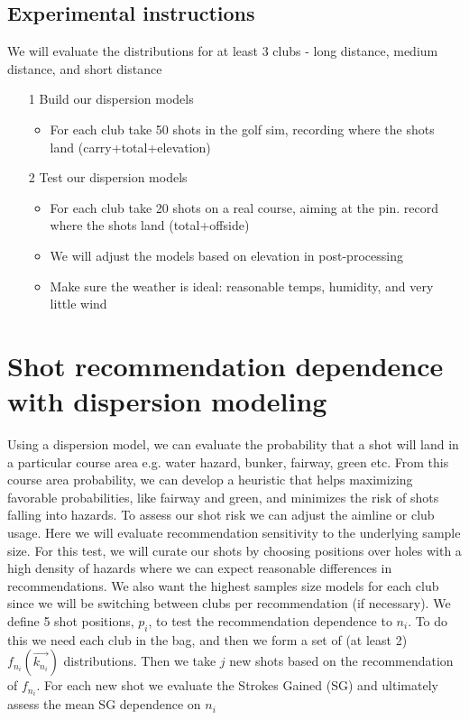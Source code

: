\documentclass{article}
\begin{document}
\subsection{Experimental instructions}
We will evaluate the distributions for at least 3 clubs - long distance, medium distance, and short distance\\
\begin{itemize}
	\item[1] Build our dispersion models
		\begin{itemize} 
			\item For each club take 50 shots in the golf sim, recording where the shots land (carry+total+elevation)
		\end{itemize}
	\item[2] Test our dispersion models
		\begin{itemize}
			\item For each club take 20 shots on a real course, aiming at the pin. record where the shots land (total+offside)
			\item We will adjust the models based on elevation in post-processing
			\item Make sure the weather is ideal: reasonable temps, humidity, and very little wind
		\end{itemize}
\end{itemize}


\section{Shot recommendation dependence with dispersion modeling}
Using a dispersion model, we can evaluate the probability that a shot will land in a particular course area e.g. water hazard, bunker, fairway, green etc. From this course area probability, we can develop a heuristic that helps maximizing favorable probabilities, like fairway and green, and minimizes the risk of shots falling into hazards. To assess our shot risk we can adjust the aimline or club usage. Here we will evaluate recommendation sensitivity to the underlying sample size. For this test, we will curate our shots by choosing positions over holes with a high density of hazards where we can expect reasonable differences in recommendations. We also want the highest samples size models for each club since we will be switching between clubs per recommendation (if necessary). We define 5 shot positions, $p_i$, to test the recommendation dependence to $n_i$. To do this we need each club in the bag, and then we form a set of (at least 2) $f_{n_i}( \vec{k_{n_i}} )$ distributions. Then we take $j$ new shots based on the recommendation of $f_{n_i}$. For each new shot we evaluate the Strokes Gained (SG) and ultimately assess the mean SG dependence on $n_i$
\end{document}
